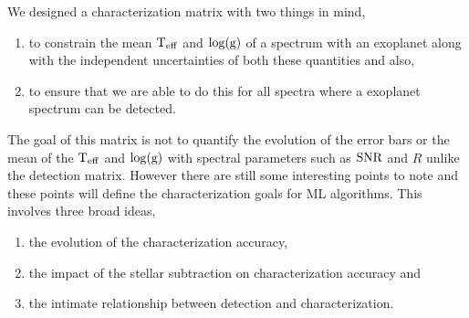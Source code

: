 We designed a characterization matrix with two things in mind,
\begin{enumerate}
\item to constrain the mean $\rm{T_{eff}}$ and $\rm{\log(g)}$ of a spectrum with an exoplanet along with the independent uncertainties of both these quantities and also,
\item to ensure that we are able to do this for all spectra where a exoplanet spectrum can be detected.
\end{enumerate}
The goal of this matrix is not to quantify the evolution of the error bars or the mean of the $\rm{T_{eff}}$ and $\rm{\log(g)}$ with spectral parameters such as $\rm{SNR}$ and $R$ unlike the detection matrix.
However there are still some interesting points to note and these points will define the characterization goals for ML algorithms.
This involves three broad ideas,
\begin{enumerate}
    \item the evolution of the characterization accuracy,
    \item the impact of the stellar subtraction on characterization accuracy and
    \item the intimate relationship between detection and characterization.
\end{enumerate}
